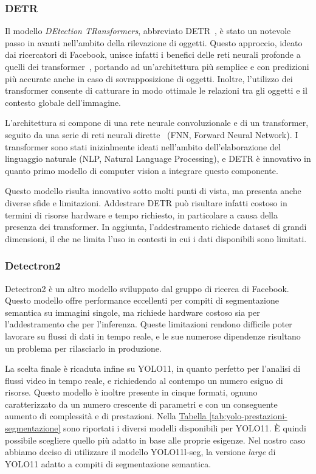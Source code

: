 \documentclass[12pt]{report}
\begin{document}
\subsubsection{DETR}
\label{sec:detr}

Il modello \textit{DEtection TRansformers}, abbreviato DETR~\cite{carion2020end}, è stato un notevole passo in avanti nell'ambito della rilevazione di oggetti. Questo approccio, ideato dai ricercatori di Facebook, unisce infatti i benefici delle reti neurali profonde a quelli dei transformer~\cite{10.1145/3505244}, portando ad un'architettura più semplice e con predizioni più accurate anche in caso di sovrapposizione di oggetti. Inoltre, l'utilizzo dei transformer consente di catturare in modo ottimale le relazioni tra gli oggetti e il contesto globale dell'immagine.

L'architettura si compone di una rete neurale convoluzionale e di un transformer, seguito da una serie di reti neurali dirette~\cite{article_890416} (FNN, Forward Neural Network). I transformer sono stati inizialmente ideati nell'ambito dell'elaborazione del linguaggio naturale (NLP, Natural Language Processing), e DETR è innovativo in quanto primo modello di computer vision a integrare questo componente.

Questo modello risulta innovativo sotto molti punti di vista, ma presenta anche diverse sfide e limitazioni. Addestrare DETR può risultare infatti costoso in termini di risorse hardware e tempo richiesto, in particolare a causa della presenza dei transformer. In aggiunta, l'addestramento richiede dataset di grandi dimensioni, il che ne limita l'uso in contesti in cui i dati disponibili sono limitati.

\subsubsection{Detectron2}
\label{sec:detectron}

Detectron2 è un altro modello sviluppato dal gruppo di ricerca di Facebook. Questo modello offre performance eccellenti per compiti di segmentazione semantica su immagini singole, ma richiede hardware costoso sia per l'addestramento che per l'inferenza. Queste limitazioni rendono difficile poter lavorare su flussi di dati in tempo reale, e le sue numerose dipendenze risultano un problema per rilasciarlo in produzione.

\vspace{10pt}

La scelta finale è ricaduta infine su YOLO11, in quanto perfetto per l'analisi di flussi video in tempo reale, e richiedendo al contempo un numero esiguo di risorse. Questo modello è inoltre presente in cinque formati, ognuno caratterizzato da un numero crescente di parametri e con un conseguente aumento di complessità e di prestazioni. Nella \hyperref[tab:yolo-prestazioni-segmentazione]{Tabella \ref{tab:yolo-prestazioni-segmentazione}} sono riportati i diversi modelli disponibili per YOLO11. È quindi possibile scegliere quello più adatto in base alle proprie esigenze. Nel nostro caso abbiamo deciso di utilizzare il modello YOLO11l-seg, la versione \textit{large} di YOLO11 adatto a compiti di segmentazione semantica.
\end{document}
